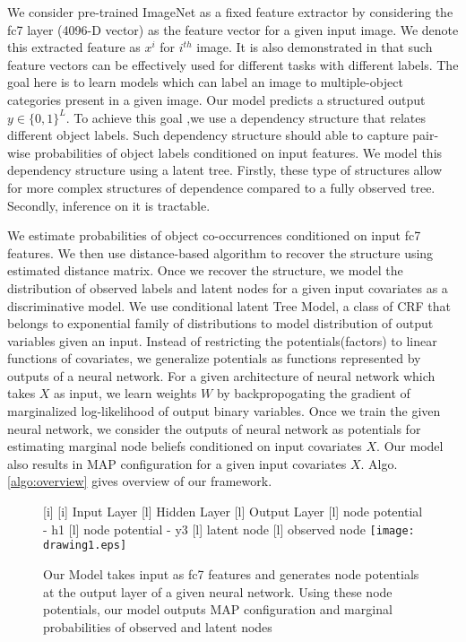 \documentclass{article}
\begin{document}
We consider pre-trained ImageNet \cite{imagenet} as  a fixed feature extractor by considering the fc7 layer (4096-D vector) as the feature vector for a given input image.  We denote this extracted feature  as $x^{i}$  for $i^{th}$ image.  It is also demonstrated in \cite{transferable} that such feature vectors can be effectively used for different tasks with different labels. The goal here is to learn models which can label an image to multiple-object categories present in a given image. Our model predicts a structured output  $y \in \{0,1\}^{L}$.  To achieve this goal ,we use a dependency structure that relates different object labels. Such dependency structure should able to capture pair-wise probabilities of object labels conditioned on input features. We model this dependency structure using a latent tree. Firstly, these type of structures allow for more complex structures of dependence compared to a fully observed tree. Secondly, inference on it is tractable.


We estimate probabilities of object co-occurrences conditioned on input fc7 features. We then use distance-based algorithm to recover the structure using estimated distance matrix.  Once we recover the structure, we model the distribution of observed labels and latent nodes for a given input covariates as a discriminative model. We use conditional latent Tree Model, a class of CRF that belongs to exponential family of distributions to model distribution of output variables given an input. Instead of restricting the potentials(factors) to linear functions of covariates, we generalize potentials as functions represented by outputs of a neural network. For a given architecture of neural network which takes $X$ as input, we learn weights $W$ by  backpropogating the gradient of marginalized log-likelihood of output binary variables. Once we train the given neural network, we consider the outputs of neural network as  potentials for estimating marginal node beliefs conditioned on input covariates $X$. Our model also results in MAP configuration for a given input covariates $X$. Algo.\ref{algo:overview} gives overview of our framework.

\begin{figure}
\begin{center}
[i]{}
[i]{ \tiny{Input Layer}}
[l]{ \tiny{Hidden Layer}}
[l]{ \tiny{Output Layer}}
[l]{ \tiny{node potential - h1}}
[l]{ \tiny{node potential - y3}}
[l]{ \tiny{latent node}}
[l]{ \tiny{observed node}}
\texttt{[image: drawing1.eps]}
\end{center}
\vspace{-0.15in}

\caption{ Our Model takes input as fc7 features and generates node potentials at the output layer of a given neural network. Using these node potentials, our model outputs MAP configuration and marginal probabilities of observed and latent nodes}
\label{neuralnet}
\end{figure}
\end{document}

